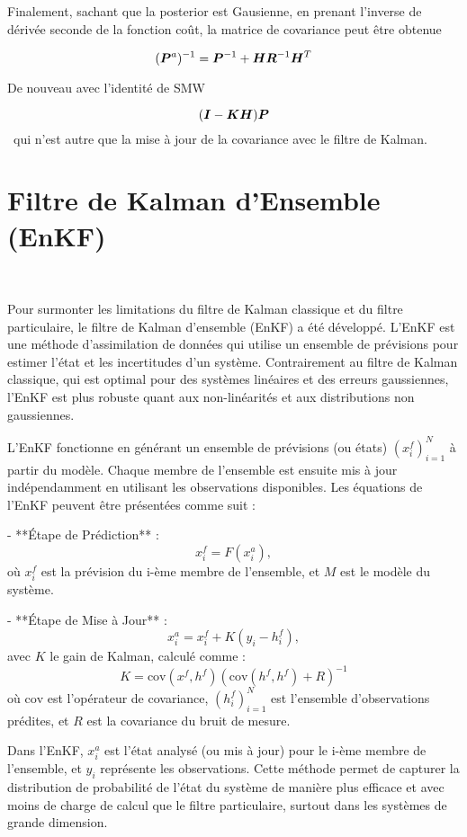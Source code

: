 Finalement, sachant que la posterior est Gausienne, en prenant l'inverse de dérivée seconde de la fonction coût, la matrice de covariance peut être obtenue

\begin{equation*}
    (\bm{P}^a)^{-1} = \bm{P}^{-1} + \bm{H} \bm{R}^{-1} \bm{H}^T
\end{equation*}

De nouveau avec l'identité de SMW

\begin{equation*}
    (\bm{I} - \bm{K} \bm{H}) \bm{P}
\end{equation*}~qui n'est autre que la mise à jour de la covariance avec le filtre de Kalman.


\section{Filtre de Kalman d'Ensemble (EnKF)}~\label{sec:enkf}

Pour surmonter les limitations du filtre de Kalman classique et du filtre particulaire, le filtre de Kalman d'ensemble (EnKF) a été développé. L'EnKF est une méthode d'assimilation de données qui utilise un ensemble de prévisions pour estimer l'état et les incertitudes d'un système. Contrairement au filtre de Kalman classique, qui est optimal pour des systèmes linéaires et des erreurs gaussiennes, l'EnKF est plus robuste quant aux non-linéarités et aux distributions non gaussiennes.

L'EnKF fonctionne en générant un ensemble de prévisions  (ou états) $(x_i^f)_{i=1}^N$ à partir du modèle. Chaque membre de l'ensemble est ensuite mis à jour indépendamment en utilisant les observations disponibles. Les équations de l'EnKF peuvent être présentées comme suit :

- **Étape de Prédiction** :
$$x_i^f = F(x_i^a),$$
où $x_{i}^{f}$ est la prévision du i-ème membre de l'ensemble, et $M$ est le modèle du système.

- **Étape de Mise à Jour** :
$$x_{i}^{a} = x_{i}^{f} + K(y_{i} - h_i^f),$$
avec $K$ le gain de Kalman, calculé comme :
$$K = \text{cov}(x^f, h^f)(\text{cov}(h^f, h^f) + R)^{-1}$$
où $\text{cov}$ est l'opérateur de covariance, $(h_i^f)_{i=1}^N$ est l'ensemble d'observations prédites, et $R$ est la covariance du bruit de mesure.

Dans l'EnKF, $x_{i}^{a}$ est l'état analysé (ou mis à jour) pour le i-ème membre de l'ensemble, et $y_i$ représente les observations. Cette méthode permet de capturer la distribution de probabilité de l'état du système de manière plus efficace et avec moins de charge de calcul que le filtre particulaire, surtout dans les systèmes de grande dimension.

